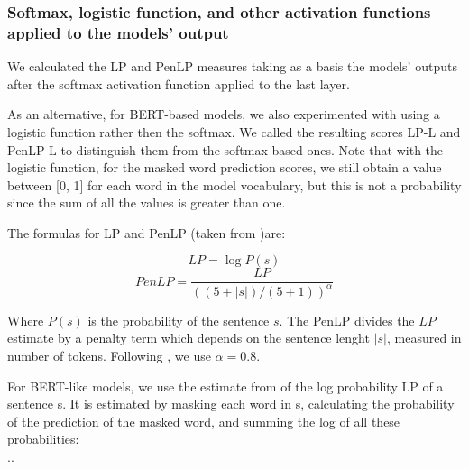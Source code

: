 \subsubsection{Softmax, logistic function, and other activation functions applied to the models' output}
\label{sec:softmax}
We calculated the LP and PenLP measures taking as a basis the models' outputs after the softmax activation function applied to the last layer. 

As an alternative, for BERT-based models, we also experimented with using a logistic function rather then the softmax. We called the resulting scores LP-L and PenLP-L to distinguish them from the softmax based ones. Note that with the logistic function, for the masked word prediction scores, we still obtain a value between [0, 1] for each word in the model vocabulary, but this is not a probability since the sum of all the values is greater than one.

The formulas for LP and PenLP (taken from \citep{lau2020furiously})are:

\begin{displaymath}
	LP = \log P(s)
\end{displaymath}
\begin{displaymath}
	PenLP = \frac{LP}{((5+|s|) \big/ (5+1))^\alpha}
\end{displaymath}

Where \( P(s) \) is the probability of the sentence \( s \). The PenLP divides the \( LP \) estimate by a penalty term which depends on the sentence lenght \( |s| \), measured in number of tokens. Following \citet{lau2020furiously}, we use \( \alpha=0.8 \).

For BERT-like models, we use the estimate from \citet{lau2020furiously} of the log probability LP of a sentence s. It is estimated by masking each word in s, calculating the probability of the prediction of the masked word, and summing the log of all these probabilities:
\\ ..

